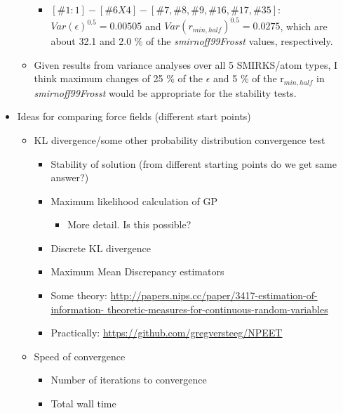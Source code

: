 \documentclass[aps,pre,nofootinbib,superscriptaddress,linenumbers,10pt, draft,tightenlines]{revtex4-1}
\begin{document}
\begin{itemize}
\begin{itemize}
\begin{itemize}
                \item $[\#1:1]-[\#6X4]-[\#7,\#8,\#9,\#16,\#17,\#35]$:                                                   $Var\left(\epsilon\right)^{0.5} = 0.00505$ and                                                   $Var\left(r_{min,half}\right)^{0.5} = 0.0275$, which are about 
                      32.1 and 2.0 \% of the \textit{smirnoff99Frosst} values, respectively.
            \end{itemize}
            \item Given results from variance analyses over all 5 SMIRKS/atom types, I think
                  maximum changes of 25 \% of the $\epsilon$ and 5 \% of the r$_{min,half}$ in 
                  \textit{smirnoff99Frosst} would be appropriate for the stability tests.
        \end{itemize}
    \item Ideas for comparing force fields (different start points) 
    \begin{itemize}
    	\item KL divergence/some other probability distribution convergence test
        \begin{itemize}
            \item Stability of solution (from different starting points do we get same answer?)
            \item Maximum likelihood calculation of GP
            \begin{itemize}
                \item More detail. Is this possible? 
            \end{itemize}
            \item Discrete KL divergence
            \item Maximum Mean Discrepancy estimators
            \item Some theory: \url{http://papers.nips.cc/paper/3417-estimation-of-information-
                  theoretic-measures-for-continuous-random-variables}
            \item Practically: \url{https://github.com/gregversteeg/NPEET}
        \end{itemize}
    	\item Speed of convergence
        \begin{itemize}
            \item Number of iterations to convergence
            \item Total wall time

\end{itemize}
\end{itemize}
\end{itemize}
\end{document}
